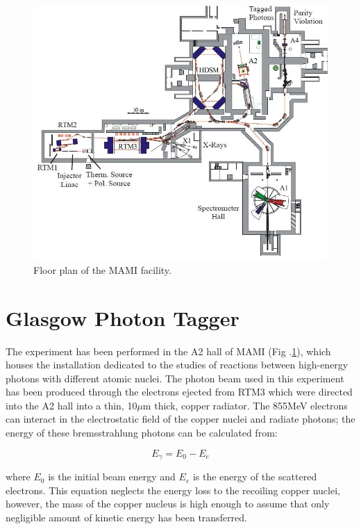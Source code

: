 \begin{figure}[H]
\begin{center}
\includegraphics[scale=0.5]{pictures/jpg/mamifloor.jpg}
\caption{Floor plan of the MAMI facility.}
\label{mamifloor}
\end{center}
\end{figure}

\section{Glasgow Photon Tagger}

\indent The experiment has been performed in the A2 hall of MAMI (Fig .\ref{mamifloor}), which houses the installation dedicated to the studies of reactions between high-energy photons with different atomic nuclei. The photon beam used in this experiment has been produced through the electrons ejected from RTM3 which were directed into the A2 hall into a thin, 10$\mu$m thick, copper radiator. The 855MeV electrons can interact in the electrostatic field of the copper nuclei and radiate photons; the energy of these bremsstrahlung photons can be calculated from:

\begin{equation}
E_{\gamma}=E_{0}-E_{e}
\end{equation}

where $E_{0}$ is the initial beam energy and $E_{e}$ is the energy of the scattered electrons. This equation neglects the energy loss to the recoiling copper nuclei, however, the mass of the copper nucleus is high enough to assume that only negligible amount of kinetic energy has been transferred.


